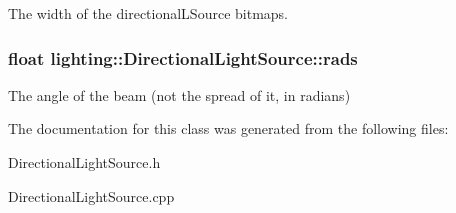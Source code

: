 The width of the directional\+L\+Source bitmaps. 

\subsubsection[{\texorpdfstring{rads}{rads}}]{\setlength{\rightskip}{0pt plus 5cm}float lighting\+::\+Directional\+Light\+Source\+::rads\hspace{0.3cm}{\ttfamily [protected]}}\hypertarget{classlighting_1_1DirectionalLightSource_af31141ab246928972aa52224e17ae46c}{}\label{classlighting_1_1DirectionalLightSource_af31141ab246928972aa52224e17ae46c}


The angle of the beam (not the spread of it, in radians) 



The documentation for this class was generated from the following files\+:\begin{DoxyCompactItemize}
\item 
Directional\+Light\+Source.\+h\item 
Directional\+Light\+Source.\+cpp\end{DoxyCompactItemize}
